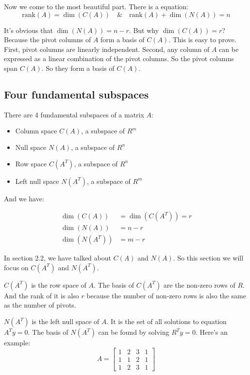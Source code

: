 \documentclass[12pt]{ctexart}
\begin{document}
Now we come to the most beautiful part. There is a equation:
\[
  \text{rank}(A) = \dim(C(A)) \quad \& \quad \text{rank}(A) + \dim(N(A)) = n
\]

It's obvious that $\dim(N(A)) = n - r$. But why $\dim(C(A)) = r$? Because the pivot
columns of $A$ form a basis of $C(A)$. This is easy to prove. First, pivot columns
are linearly independent. Second, any column of $A$ can be expressed as a linear
combination of the pivot columns. So the pivot columns span $C(A)$. So they form a
basis of $C(A)$.

\subsection{\textbf{Four fundamental subspaces}}

There are 4 fundamental subspaces of a matrix $A$:
\begin{itemize}
  \item Column space $C(A)$, a subspace of $R^{m}$
  \item Null space $N(A)$, a subspace of $R^{n}$
  \item Row space $C(A^{T})$, a subspace of $R^{n}$
  \item Left null space $N(A^{T})$, a subspace of $R^{m}$
\end{itemize}

And we have:

\begin{align*}
  \dim(C(A)) &= \dim(C(A^{T})) = r \\
  \dim(N(A)) &= n - r  \\
  \dim(N(A^{T})) &= m - r
\end{align*}

In section 2.2, we have talked about $C(A)$ and $N(A)$. So this section we will focus
on $C(A^{T})$ and $N(A^{T})$.

$C(A^{T})$ is the row space of $A$. The basis of $C(A^{T})$ are the non-zero rows of
$R$. And the rank of it is also $r$ because the number of non-zero rows is also the
same as the number of pivots.

$N(A^{T})$ is the left null space of $A$. It is the set of all solutions to equation
$A^{T}y = 0$. The basis of $N(A^{T})$ can be found by solving $R^{T}y = 0$. Here's
an example:
\[
  A = \begin{bmatrix}
    1 & 2 & 3 & 1 \\
    1 & 1 & 2 & 1 \\
    1 & 2 & 3 & 1
  \end{bmatrix}
\]
\end{document}
